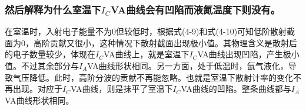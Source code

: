 \documentclass[a4paper]{article}
\begin{document}
\subsubsection{然后解释为什么室温下$I_C$VA曲线会有凹陷而液氮温度下则没有。}
在室温时，入射电子能量不为0但较低时，根据式(4-9)和式(4-10)可知低阶散射截面为0，高阶贡献又很小，这种情况下散射截面出现极小值。其物理含义是散射后的电子数量较少，体现在$I_C$VA曲线上，就是室温下$I_C$VA曲线出现凹陷，产生极小值。不过其余部分与$I_A$VA曲线形状相同。另一方面，处于低温时，氙气液化，导致气压降低。此时，高阶分波的贡献不再能忽略。也就是室温下散射计率的变化不再出现。对应于$I_C$VA曲线，则是抹平了室温下$I_C$VA曲线的凹陷。整条曲线都与$I_A$VA曲线形状相同。

\end{document}
